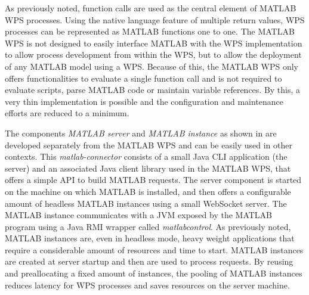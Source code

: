 		As previously noted, function calls are used as the central element of MATLAB WPS processes. Using the native language feature of multiple return values, WPS processes can be represented as MATLAB functions one to one. The MATLAB WPS is not designed to easily interface MATLAB with the WPS implementation to allow process development from within the WPS, but to allow the deployment of any MATLAB model using a WPS. Because of this, the MATLAB WPS only offers functionalities to evaluate a single function call and is not required to evaluate scripts, parse MATLAB code or maintain variable references. By this, a very thin implementation is possible and the configuration and maintenance efforts are reduced to a minimum.

		The components \emph{MATLAB server} and \emph{MATLAB instance} as shown in  are developed separately from the MATLAB WPS and can be easily used in other contexts. This \emph{matlab-connector} consists of a small Java CLI application (the server) and an associated Java client library used in the MATLAB WPS, that offers a simple \ac{API} to build MATLAB requests. The server component is started on the machine on which MATLAB is installed, and then offers a configurable amount of headless  MATLAB instances using a small WebSocket server. The MATLAB instance communicates with a \ac{JVM} exposed by the MATLAB program using a Java \ac{RMI} wrapper called \emph{matlabcontrol}. As previously noted, MATLAB instances are, even in headless mode, heavy weight applications that require a considerable amount of resources and time to start. MATLAB instances are created at server startup and then are used to process requests. By reusing and preallocating a fixed amount of instances, the pooling of MATLAB instances reduces latency for WPS processes and saves resources on the server machine.


